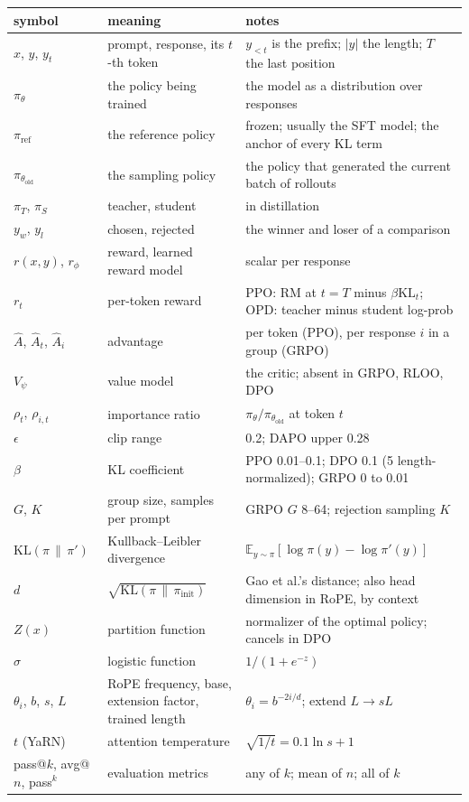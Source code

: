 \documentclass[11pt,letterpaper]{article}
\newcommand{\piref}{\pi_{\mathrm{ref}}}
\newcommand{\pit}{\pi_\theta}\newcommand{\KL}{\mathrm{KL}}
\begin{document}
\begin{center}\footnotesize\setlength{\tabcolsep}{4pt}
\begin{tabular}{@{}lp{4.3cm}p{6.7cm}@{}}
\toprule
symbol & meaning & notes\\
\midrule
$x$, $y$, $y_t$ & prompt, response, its $t$-th token & $y_{<t}$ is the prefix; $|y|$ the length; $T$ the last position\\
$\pit$ & the policy being trained & the model as a distribution over responses\\
$\piref$ & the reference policy & frozen; usually the SFT model; the anchor of every KL term\\
$\pi_{\theta_{\text{old}}}$ & the sampling policy & the policy that generated the current batch of rollouts\\
$\pi_T$, $\pi_S$ & teacher, student & in distillation\\
$y_w$, $y_l$ & chosen, rejected & the winner and loser of a comparison\\
$r(x,y)$, $r_\phi$ & reward, learned reward model & scalar per response\\
$r_t$ & per-token reward & PPO: RM at $t=T$ minus $\beta\KL_t$; OPD: teacher minus student log-prob\\
$\hat A$, $\hat A_t$, $\hat A_i$ & advantage & per token (PPO), per response $i$ in a group (GRPO)\\
$V_\psi$ & value model & the critic; absent in GRPO, RLOO, DPO\\
$\rho_t$, $\rho_{i,t}$ & importance ratio & $\pit/\pi_{\theta_{\text{old}}}$ at token $t$\\
$\epsilon$ & clip range & 0.2; DAPO upper 0.28\\
$\beta$ & KL coefficient & PPO 0.01--0.1; DPO 0.1 (5 length-normalized); GRPO 0 to 0.01\\
$G$, $K$ & group size, samples per prompt & GRPO $G$ 8--64; rejection sampling $K$\\
$\KL(\pi\,\|\,\pi')$ & Kullback--Leibler divergence & $\mathbb{E}_{y\sim\pi}[\log\pi(y)-\log\pi'(y)]$\\
$d$ & $\sqrt{\KL(\pi\,\|\,\pi_{\text{init}})}$ & Gao et al.'s distance; also head dimension in RoPE, by context\\
$Z(x)$ & partition function & normalizer of the optimal policy; cancels in DPO\\
$\sigma$ & logistic function & $1/(1+e^{-z})$\\
$\theta_i$, $b$, $s$, $L$ & RoPE frequency, base, extension factor, trained length & $\theta_i=b^{-2i/d}$; extend $L\to sL$\\
$t$ (YaRN) & attention temperature & $\sqrt{1/t}=0.1\ln s+1$\\
pass@$k$, avg@$n$, pass$^k$ & evaluation metrics & any of $k$; mean of $n$; all of $k$\\
\bottomrule
\end{tabular}
\end{center}
\end{document}

